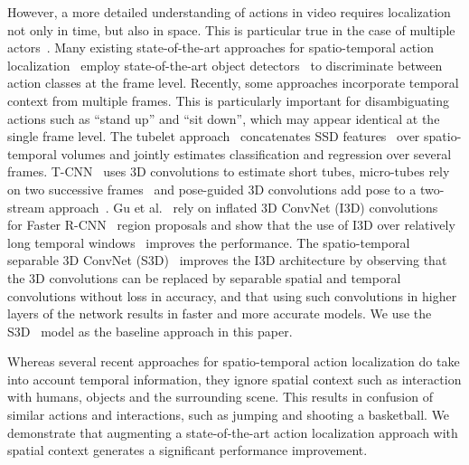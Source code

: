 \documentclass[runningheads]{llncs}
\begin{document}
However, a more detailed understanding of actions in video requires localization not only in time, but also in space. This is particular true in the case of multiple actors~\cite{ava_cvpr18}. Many existing state-of-the-art approaches for spatio-temporal action localization~\cite{gkioxari2015,peng2016multi,saha2016,Singh_ICCV2017,weinzaepfel2015} employ state-of-the-art object detectors~\cite{SSD-Multibox,ren2015faster} to discriminate between action classes at the frame level. Recently, some approaches incorporate temporal context from multiple frames. This is particularly important for disambiguating actions such as ``stand up'' and ``sit down'', which may appear identical at the single frame level.
The tubelet approach~\cite{tubelets_iccv17} concatenates SSD features~\cite{SSD-Multibox} over spatio-temporal volumes and jointly estimates classification and regression over several frames. T-CNN~\cite{T_CNN_iccv17} uses 3D convolutions to estimate short tubes, micro-tubes rely on two successive frames~\cite{micro_tube2017} and pose-guided 3D convolutions add pose to a two-stream approach~\cite{pose_brox2017}.  Gu et al.~\cite{ava_cvpr18} rely on inflated 3D ConvNet (I3D) convolutions~\cite{i3d_cvpr17} for Faster R-CNN~\cite{ren2015faster} region proposals and show that the use of I3D over relatively long temporal windows~\cite{varol_pami17} improves the performance. The spatio-temporal separable 3D ConvNet (S3D)~\cite{s3dg_2017} improves the I3D architecture by observing that the 3D convolutions can be replaced by separable spatial and temporal convolutions without loss in accuracy, and that using such convolutions in higher layers of the network results in faster and more accurate models. We use the S3D~\cite{s3dg_2017} model as the baseline approach in this paper. 

Whereas several recent approaches for spatio-temporal action localization do take into account temporal information, they ignore spatial context such as interaction with humans, objects and the surrounding scene. This results in confusion of similar actions and interactions, such as jumping and shooting a basketball. 
We demonstrate that augmenting a state-of-the-art action localization approach with spatial context generates a significant performance improvement. 
~\\
\end{document}
